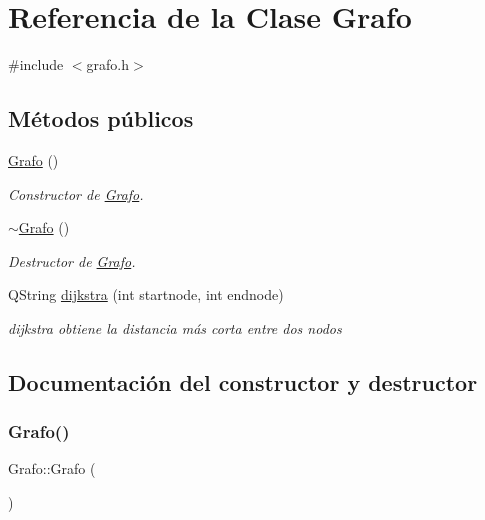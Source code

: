 \hypertarget{class_grafo}{}\section{Referencia de la Clase Grafo}
\label{class_grafo}


{\ttfamily \#include $<$grafo.\+h$>$}

\subsection*{Métodos públicos}
\begin{DoxyCompactItemize}
\item 
\hyperlink{class_grafo_ab810bbe26a98e9af6661ccddff66b03b}{Grafo} ()
\begin{DoxyCompactList}\small\item\em Constructor de \hyperlink{class_grafo}{Grafo}. \end{DoxyCompactList}\item 
\hyperlink{class_grafo_a16f3fbba0de2667dfba3b657cb7e95ff}{$\sim$\+Grafo} ()
\begin{DoxyCompactList}\small\item\em Destructor de \hyperlink{class_grafo}{Grafo}. \end{DoxyCompactList}\item 
Q\+String \hyperlink{class_grafo_a8fe931a9a154866add1bf763dcb88c12}{dijkstra} (int startnode, int endnode)
\begin{DoxyCompactList}\small\item\em dijkstra obtiene la distancia más corta entre dos nodos \end{DoxyCompactList}\end{DoxyCompactItemize}


\subsection{Documentación del constructor y destructor}
\mbox{\label{class_grafo_ab810bbe26a98e9af6661ccddff66b03b}} 
\subsubsection{\texorpdfstring{Grafo()}{Grafo()}}
{\footnotesize\ttfamily Grafo\+::\+Grafo (\begin{DoxyParamCaption}{ }\end{DoxyParamCaption})}



